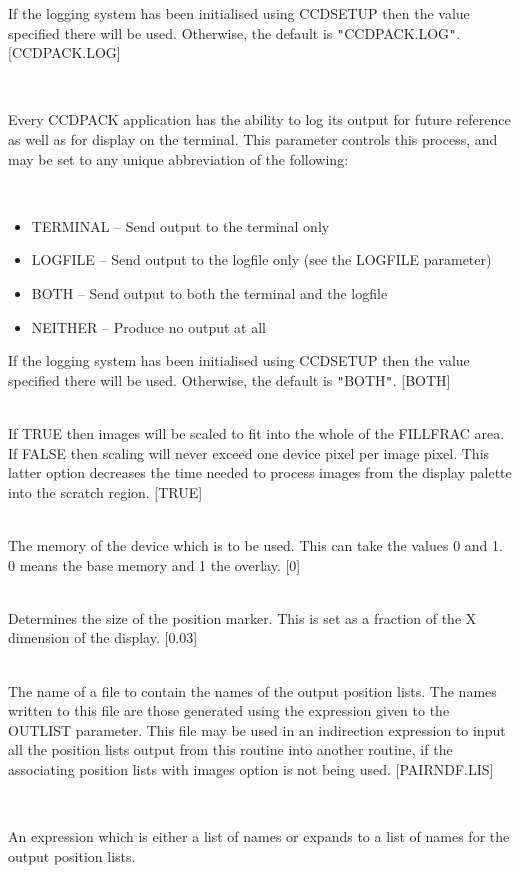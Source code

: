 \documentclass[twoside,11pt]{article}
\newcommand{\htmlref}[2]{#1}
\renewcommand{\_}{\texttt{\symbol{95}}}
\newcommand{\qt}[1]{{\tt "}#1{\tt "}}
\newcommand{\xroutine}[1]{\htmlref{{\sc #1}}{#1}}
\newcommand{\sstsubsection}[1]{ \item[{#1}] \mbox{} \\}
\newcommand{\sstitemlist}[1]{
  \mbox{} \\
  \vspace{-3.5ex}
  \begin{itemize}
     #1
  \end{itemize}
}
\newcommand{\sstitem}{\item}
\newcommand{\sstsubsection}[1]{\item[{#1}]}
\newcommand{\sstitemlist}[1]{
      \begin{itemize}
         #1
      \end{itemize}
      \\
   }
\newcommand{\sstitem}{\item}
\begin{document}
{{{         If the logging system has been initialised using \xroutine{CCDSETUP}
         then the value specified there will be used. Otherwise, the
         default is \qt{CCDPACK.LOG}.
         [CCDPACK.LOG]
      }
      \sstsubsection{
         LOGTO = LITERAL (Read)
      } {
         Every CCDPACK application has the ability to log its output
         for future reference as well as for display on the terminal.
         This parameter controls this process, and may be set to any
         unique abbreviation of the following:
         \sstitemlist{

            \sstitem
               TERMINAL  -- Send output to the terminal only

            \sstitem
               LOGFILE   -- Send output to the logfile only (see the
                               LOGFILE parameter)

            \sstitem
               BOTH      -- Send output to both the terminal and the
                               logfile

            \sstitem
               NEITHER   -- Produce no output at all

         }
         If the logging system has been initialised using \xroutine{CCDSETUP}
         then the value specified there will be used. Otherwise, the
         default is \qt{BOTH}.
         [BOTH]
      }
      \sstsubsection{
         MAKEBIG = \_LOGICAL (Read)
      } {
         If TRUE then images will be scaled to fit into the whole of
         the FILLFRAC area. If FALSE then scaling will never exceed
         one device pixel per image pixel. This latter option decreases
         the time needed to process images from the display palette
         into the scratch region.
         [TRUE]
      }
      \sstsubsection{
         MEMORY = \_INTEGER (Read)
      } {
         The memory of the device which is to be used. This can take
         the values 0 and 1. 0 means the base memory and 1 the overlay.
         [0]
      }
      \sstsubsection{
         MSIZE = \_REAL (Read)
      } {
         Determines the size of the position marker. This is set as a
         fraction of the X dimension of the display.
         [0.03]
      }
      \sstsubsection{
         NAMELIST = LITERAL (Read)
      } {
         The name of a file to contain the names of the output
         position lists. The names written to this file are those
         generated using the expression given to the OUTLIST parameter.
         This file may be used in an indirection expression to input
         all the position lists output from this routine into another
         routine, if the associating position lists with images option is
         not being used.
         [PAIRNDF.LIS]
      }
      \sstsubsection{
         OUTLIST = LITERAL (Read)
      } {
         An expression which is either a list of names or expands to a
         list of names for the output position lists.

}}}
\end{document}
